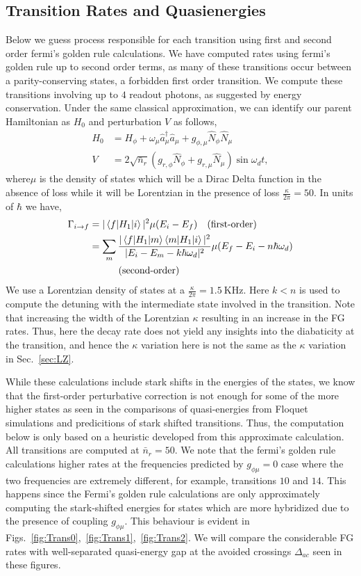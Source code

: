 \documentclass[%
reprint,
superscriptaddress,
 amsmath,amssymb,
 aps,
 prx,
longbibliography,
floatfix,
]{revtex4-2}
\begin{document}
\subsection{Transition Rates and Quasienergies}\label{app:Floquet-trans}
Below we guess process responsible for each transition using first and second order fermi's golden rule calculations. We have computed rates using fermi's golden rule up to second order terms, as many of these transitions occur between a parity-conserving states, a forbidden first order transition. We compute these transitions involving up to $4$ readout photons, as suggested by energy conservation. 
Under the same classical approximation, we can identify our parent Hamiltonian as $H_0$ and perturbation $V$ as follows,
\begin{align}
H_0&=H_{\phi}+\omega_\mu \hat a_\mu^\dagger \hat a_\mu+g_{\phi,\mu}\hat N_\phi \hat N_\mu\\
V&=2\sqrt{\bar n_r}(g_{r,\phi} \hat N_\phi+g_{r,\mu}\hat N_\mu)\sin{\omega_d t},
\end{align}
where$\mu$ is the density of states which will be a Dirac Delta function in the absence of loss while it will be Lorentzian in the presence of loss $\frac{\kappa}{2\pi}=50$. In units of $\hbar$ we have,
\begin{align}
    \Gamma_{i\rightarrow f}&=|\braket{f|H_1|i}|^2\mu(E_i-E_f)\quad\textrm{(first-order)}\\
&=\sum_m\frac{|\braket{f|H_1|m}\braket{m|H_1|i}|^2}{|E_i-E_m-k\hbar\omega_d|^2}\mu(E_f-E_i-n\hbar \omega_d)\nonumber\\&\quad\quad\quad\textrm{(second-order)}
\end{align}
We use a Lorentzian density of states at a $\frac{\kappa}{2\pi}=1.5 \ \mathrm{KHz}$. Here $k<n$ is used to compute the detuning with the intermediate state involved in the transition. Note that increasing the width of the Lorentzian $\kappa$ resulting in an increase in the FG rates. Thus, here the decay rate does not yield any insights into the diabaticity at the transition, and hence the $\kappa$ variation here is not the same as the $\kappa$ variation in Sec.~\ref{sec:LZ}.

While these calculations include stark shifts in the energies of the states, we know that the first-order perturbative correction is not enough for some of the more higher states as seen in the comparisons of quasi-energies from Floquet simulations and predicitions of stark shifted transitions. Thus, the computation below is only based on a heuristic developed from this approximate calculation. All transitions are computed at $\bar n_r=50$. We note that the fermi's golden rule calculations higher rates at the frequencies predicted by $g_{\phi\mu}=0$ case where the two frequencies are extremely different, for example, transitions $10$ and $14$. This happens since the Fermi's golden rule calculations are only approximately computing the stark-shifted energies for states which are more hybridized due to the presence of coupling $g_{\phi\mu}$. This behaviour is evident in Figs.~\ref{fig:Trans0},~\ref{fig:Trans1},~\ref{fig:Trans2}. We will compare the considerable FG rates with well-separated quasi-energy gap at the avoided crossings  $\Delta_{ac}$ seen in these figures.
\end{document}
